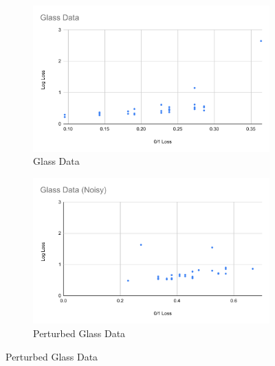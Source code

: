 \documentclass[twoside,11pt]{article}
\begin{document}
\begin{figure}[h!]
  \begin{subfigure}[b]{0.45\linewidth}
     \includegraphics[width=\linewidth]{images/Gl.pdf}
    \caption{Glass Data}
  \end{subfigure}
  \begin{subfigure}[b]{0.45\linewidth}
    \includegraphics[width=\linewidth]{images/Gl(noise).pdf}
    \caption{Perturbed Glass Data}
  \end{subfigure}
  

\end{figure}
\end{document}
